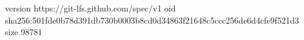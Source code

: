 version https://git-lfs.github.com/spec/v1
oid sha256:501fde0b78d391db730b0003b8cd0d34863f21648c5ccc256de6d4cfe9f521d3
size 98781
